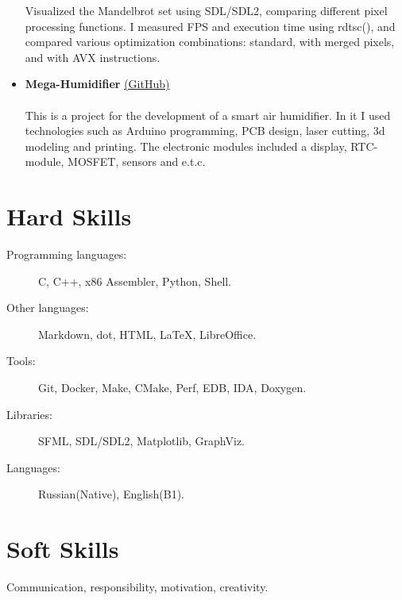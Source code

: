 \documentclass[margin,line]{resume}
\begin{document}
\begin{resume}
\begin{itemize}
            Visualized the Mandelbrot set using SDL/SDL2, comparing different pixel processing functions. I measured FPS and execution time using rdtsc(), and compared various optimization combinations: standard, with merged pixels, and with AVX instructions.
            \item[\ding{114}] \textbf{\textsf{Mega-Humidifier}} \href{https://github.com/khmelnitskiianton/mega-humidifier}{(GitHub)} \vspace{2pt} \\
             \space {}  \space {} \vspace{4pt} \\
            This is a project for the development of a smart air humidifier. In it I used technologies such as Arduino programming, PCB design, laser cutting, 3d modeling and printing. The electronic modules included a display, RTC-module, MOSFET, sensors and e.t.c.
    \end{itemize}
\section{\mysidestyle Hard Skills}
    \begin{description}
	 	\item[Programming languages:] C, C++, x86 Assembler, Python, Shell.
            \item[Other languages:] Markdown, dot, HTML, \LaTeX, LibreOffice. 
		\item[Tools:] Git, Docker, Make, CMake, Perf, EDB, IDA, Doxygen.
            \item[Libraries:] SFML, SDL/SDL2, Matplotlib, GraphViz.
            \item[Languages:] Russian(Native), English(B1).
    \end{description}
\vspace{0.2cm}
\section{\mysidestyle Soft Skills}
    Communication, responsibility, motivation, creativity.
\end{resume}   
\end{document}
